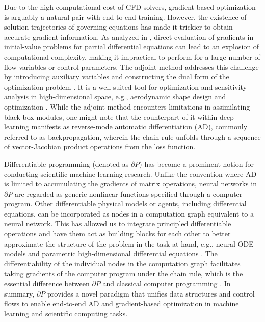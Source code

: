 \documentclass[preprint,3p,12pt,sort&compress]{elsarticle}
\begin{document}
Due to the high computational cost of CFD solvers, gradient-based optimization is arguably a natural pair with end-to-end training.
However, the existence of solution trajectories of governing equations has made it trickier to obtain accurate gradient information.
As analyzed in \cite{johnson2012notes}, direct evaluation of gradients in initial-value problems for partial differential equations can lead to an explosion of computational complexity, making it impractical to perform for a large number of flow variables or control parameters.
The adjoint method addresses this challenge by introducing auxiliary variables and constructing the dual form of the optimization problem \cite{strang2007computational,givoli2021tutorial}.
It is a well-suited tool for optimization and sensitivity analysis in high-dimensional space, e.g., aerodynamic shape design and optimization \cite{jameson2003aerodynamic}.
While the adjoint method encounters limitations in assimilating black-box modules, one might note that the counterpart of it within deep learning manifests as reverse-mode automatic differentiation (AD), commonly referred to as backpropagation, wherein the chain rule unfolds through a sequence of vector-Jacobian product operations from the loss function.

Differentiable programming (denoted as $\partial P$) has become a prominent notion for conducting scientific machine learning research.
Unlike the convention where AD is limited to accumulating the gradients of matrix operations, neural networks in $\partial P$ are regarded as generic nonlinear functions specified through a computer program.
Other differentiable physical models or agents, including differential equations, can be incorporated as nodes in a computation graph equivalent to a neural network.
This has allowed us to integrate principled differentiable operations and have them act as building blocks for each other to better approximate the structure of the problem in the task at hand, e.g., neural ODE models \cite{chen2018neural} and parametric high-dimensional differential equations \cite{rackauckas2020universal}.
The differentiability of the individual nodes in the computation graph facilitates taking gradients of the computer program under the chain rule, which is the essential difference between $\partial P$ and classical computer programming \cite{blondel2024elements}.
In summary, $\partial P$ provides a novel paradigm that unifies data structures and control flows to enable end-to-end AD and gradient-based optimization in machine learning and scientific computing tasks.
\end{document}
